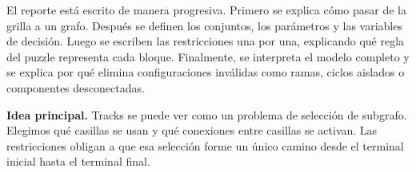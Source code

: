 El reporte está escrito de manera progresiva. Primero se explica cómo pasar de la grilla a un grafo. Después se definen los conjuntos, los parámetros y las variables de decisión. Luego se escriben las restricciones una por una, explicando qué regla del puzzle representa cada bloque. Finalmente, se interpreta el modelo completo y se explica por qué elimina configuraciones inválidas como ramas, ciclos aislados o componentes desconectadas.

\begin{formal}
    \textbf{Idea principal.}
    Tracks se puede ver como un problema de selección de subgrafo. Elegimos qué casillas se usan y qué conexiones entre casillas se activan. Las restricciones obligan a que esa selección forme un único camino desde el terminal inicial hasta el terminal final.
\end{formal}
